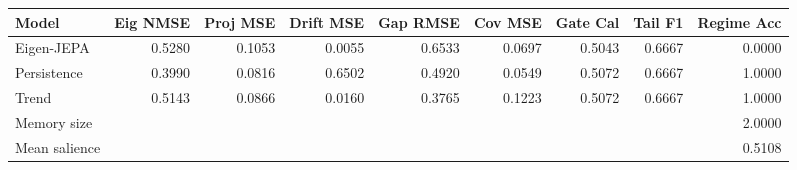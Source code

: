 \begin{tabular}{lrrrrrrrr}
\toprule
Model & Eig NMSE & Proj MSE & Drift MSE & Gap RMSE & Cov MSE & Gate Cal & Tail F1 & Regime Acc \\
\midrule
Eigen-JEPA & 0.5280 & 0.1053 & 0.0055 & 0.6533 & 0.0697 & 0.5043 & 0.6667 & 0.0000 \\
Persistence & 0.3990 & 0.0816 & 0.6502 & 0.4920 & 0.0549 & 0.5072 & 0.6667 & 1.0000 \\
Trend & 0.5143 & 0.0866 & 0.0160 & 0.3765 & 0.1223 & 0.5072 & 0.6667 & 1.0000 \\
\midrule
Memory size & \multicolumn{8}{r}{2.0000} \\
Mean salience & \multicolumn{8}{r}{0.5108} \\
\bottomrule
\end{tabular}